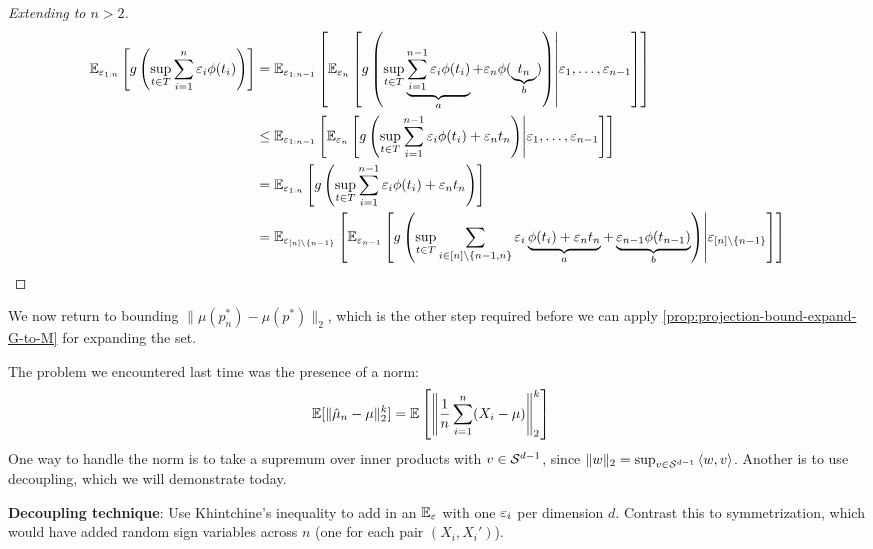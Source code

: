 \begin{proof}[Extending to $n > 2$]
  \begin{align}
    \mathbb{E}_{\varepsilon_{1:n}}\left[
      g \left(
        \sup_{t \in T} \sum_{i=1}^n \varepsilon_i \phi(t_i)
      \right)
    \right]
    &=
    \mathbb{E}_{\varepsilon_{1:n-1}} \left[
      \mathbb{E}_{\varepsilon_{n}}\left[
        g \left(
          \sup_{t \in T} \underbrace{\sum_{i=1}^{n-1} \varepsilon_i \phi(t_i)}_{a} + \varepsilon_n \phi(\underbrace{t_n}_{b})
        \right)
      \middle\vert \varepsilon_1,\ldots, \varepsilon_{n-1} \right]
    \right] \\
    &\leq
    \mathbb{E}_{\varepsilon_{1:n-1}} \left[
      \mathbb{E}_{\varepsilon_{n}}\left[
        g \left(
          \sup_{t \in T} \sum_{i=1}^{n-1} \varepsilon_i \phi(t_i) + \varepsilon_n t_n
        \right)
      \middle\vert \varepsilon_1,\ldots, \varepsilon_{n-1} \right]
    \right] \\
    &=
    \mathbb{E}_{\varepsilon_{1:n}} \left[
      g \left(
        \sup_{t \in T} \sum_{i=1}^{n-1} \varepsilon_i \phi(t_i) + \varepsilon_n t_n
      \right)
    \right] \\
    &=
    \mathbb{E}_{\varepsilon_{[n] \setminus \{n-1\}}} \left[
        \mathbb{E}_{\varepsilon_{n-1}}\left[
          g \left(
            \sup_{t \in T} \sum_{i \in [n] \setminus \{n-1, n\}} \varepsilon_i \underbrace{\phi(t_i) + \varepsilon_n t_n }_{a}
            + \underbrace{\varepsilon_{n-1} \phi(t_{n-1})}_{b}
          \right)
        \middle\lvert \varepsilon_{[n] \setminus \{n-1\}} \right]
      \right]
  \end{align}
\end{proof}



We now return to bounding $\|\mu(p_n^*) - \mu(p^*)\|_2$, which is the other
step required before we can apply \cref{prop:projection-bound-expand-G-to-M}
for expanding the set.

The problem we encountered last time was the presence of a norm:
\begin{align}
  \mathbb{E}[ \|\hat{\mu}_n - \mu\|_2^k ]
  &= \mathbb{E} \left[ \left\| \frac{1}{n} \sum_{i=1}^n (X_i - \mu)\right\|_2^k \right]
\end{align}
One way to handle the norm is to take a supremum over inner products with
$v \in \mathcal{S}^{d-1}$, since $\|w\|_2 = \sup_{v \in \mathcal{S}^{d-1}} \braket{w,v}$.
Another is to use decoupling, which we will demonstrate today.

\textbf{Decoupling technique}: Use Khintchine's inequality to add in
an $\mathbb{E}_\varepsilon$ with one $\varepsilon_i$ per dimension $d$.
Contrast this to symmetrization, which would have added random sign variables
across $n$ (one for each pair $(X_i, X_i')$).


